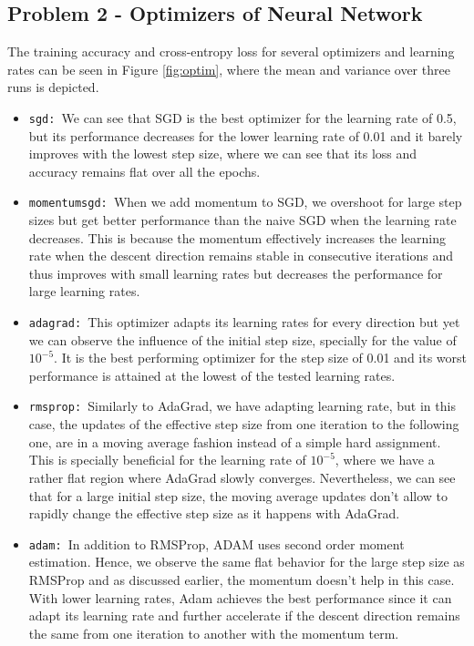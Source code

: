 \documentclass[letterpaper]{article}
\providecommand{\1}{\mathbf{1}}
\providecommand{\0}{\mathbf{0}}
\begin{document}
\subsection*{Problem 2 - Optimizers of Neural Network}

The training accuracy and cross-entropy loss for several optimizers and learning rates can be seen in Figure \ref{fig:optim}, where the mean and variance over three runs is depicted.

\begin{itemize}
    \item \texttt{sgd: }We can see that SGD is the best optimizer for the learning rate of 0.5, but its performance decreases for the lower learning rate of 0.01 and it barely improves with the lowest step size, where we can see that its loss and accuracy remains flat over all the epochs.

    \item \texttt{momentumsgd: }When we add momentum to SGD, we overshoot for large step sizes but get better performance than the naive SGD when the learning rate decreases. This is because the momentum effectively increases the learning rate when the descent direction remains stable in consecutive iterations and thus improves with small learning rates but decreases the performance for large learning rates.
    
    \item \texttt{adagrad: }This optimizer adapts its learning rates for every direction but yet we can observe the influence of the initial step size, specially for the value of $10^{-5}$. It is the best performing optimizer for the step size of 0.01 and its worst performance is attained at the lowest of the tested learning rates.
    
    \item \texttt{rmsprop: }Similarly to AdaGrad, we have adapting learning rate, but in this case, the updates of the effective step size from one iteration to the following one, are in a moving average fashion instead of a simple hard assignment. This is specially beneficial for the learning rate of $10^{-5}$, where we have a rather flat region where AdaGrad slowly converges. Nevertheless, we can see that for a large initial step size, the moving average updates don't allow to rapidly change the effective step size as it happens with AdaGrad.
    
    \item \texttt{adam: }In addition to RMSProp, ADAM uses second order moment estimation. Hence, we observe the same flat behavior for the large step size as RMSProp and as discussed earlier, the momentum doesn't help in this case. With lower learning rates, Adam achieves the best performance since it can adapt its learning rate and further accelerate if the descent direction remains the same from one iteration to another with the momentum term.
\end{itemize}
\end{document}
